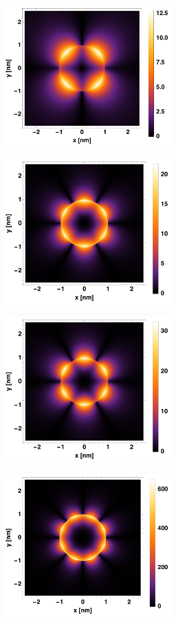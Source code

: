 \documentclass[a4paper,10pt]{article}
\begin{document}
\begin{figure}[htb!]
\begin{subfigure}[b]{0.5\textwidth}
\caption{}
\end{subfigure}
\begin{subfigure}[b]{0.5\textwidth}
\includegraphics[width=180pt]{MH2(Mar).pdf}
\caption{}
\end{subfigure}
\begin{subfigure}[b]{0.5\textwidth}
\includegraphics[width=180pt]{MH3.pdf}
\caption{}
\end{subfigure}
\begin{subfigure}[b]{0.5\textwidth}
\includegraphics[width=180pt]{MH3(Mar).pdf}
\caption{}
\end{subfigure}
\begin{subfigure}[b]{0.5\textwidth}
\includegraphics[width=180pt]{MH4.pdf}

\end{subfigure}
\end{figure}
\end{document}
